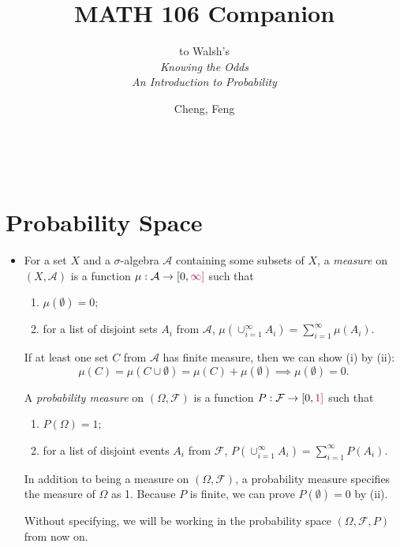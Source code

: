 \documentclass[11pt]{article}
\title{MATH 106 Companion}
\author{Cheng, Feng}
\subtitle{to Walsh's \\ \textit{Knowing the Odds \\ An Introduction to Probability}}
\makeatletter
\newcommand{\df}[1]{\textit{\textsf{#1}}} %
\newcommand{\F}{\mathcal{F}} %
\newcommand{\A}{\mathcal{A}}
\newcommand{\tpurp}[1]{\textcolor{purple}{#1}}
\let\@subtitle\@empty %
\renewcommand{\maketitle}{
    \begin{center}
        {\Large \@title}
        \@subtitle
        \vspace{0.5em}
        \\ \@author
        \vspace{-0.5em}
    \end{center}
}
\makeatother
\begin{document}
\maketitle

\section{Probability Space}
\begin{itemize}
    \item For a set $X$ and a $\sigma$-algebra $\A$ containing some subsets of $X$, a \df{measure} on $(X,\A)$ is a function $\mu: \A \to [0, \tpurp{\infty]}$ such that 
    \begin{enumerate}[label=(\roman*)]
        \item $\mu(\emptyset)=0$;
        \item for a list of disjoint sets $A_i$ from $\A$, $\mu(\cup_{i=1}^\infty A_i) = \sum_{i=1}^\infty \mu(A_i)$.
    \end{enumerate}
    If at least one set $C$ from $\A$ has finite measure, then we can show (i) by (ii): \[\mu(C) = \mu(C \cup \emptyset) = \mu(C) + \mu(\emptyset) \implies \mu(\emptyset) = 0.\]
    
    A \df{probability measure} on $(\Omega, \F)$ is a function $P: \F \to [0,\tpurp{1]}$ such that 
    \begin{enumerate}[label=(\roman*)]
        \item $P(\Omega) = 1$;
        \item for a list of disjoint events $A_i$ from $\F$, $P(\cup_{i=1}^\infty A_i) = \sum_{i=1}^\infty P(A_i)$.
    \end{enumerate}
    In addition to being a measure on $(\Omega, \F)$, a probability measure specifies the measure of $\Omega$ as 1. Because $P$ is finite, we can prove $P(\emptyset) = 0$ by (ii).
    
    Without specifying, we will be working in the probability space $(\Omega, \F, P)$ from now on.
\end{itemize}
\end{document}
